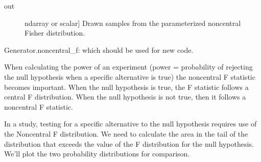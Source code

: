 \documentclass[letterpaper,10pt,english]{sphinxmanual}
\begin{document}
\begin{fulllineitems}
\begin{description}
\end{description}
\begin{description}
\item[{out}] \leavevmode{[}ndarray or scalar{]}
Drawn samples from the parameterized noncentral Fisher distribution.

\end{description}

Generator.noncentral\_f: which should be used for new code.

When calculating the power of an experiment (power = probability of
rejecting the null hypothesis when a specific alternative is true) the
non\sphinxhyphen{}central F statistic becomes important.  When the null hypothesis is
true, the F statistic follows a central F distribution. When the null
hypothesis is not true, then it follows a non\sphinxhyphen{}central F statistic.

In a study, testing for a specific alternative to the null hypothesis
requires use of the Noncentral F distribution. We need to calculate the
area in the tail of the distribution that exceeds the value of the F
distribution for the null hypothesis.  We’ll plot the two probability
distributions for comparison.


\end{fulllineitems}
\end{document}
